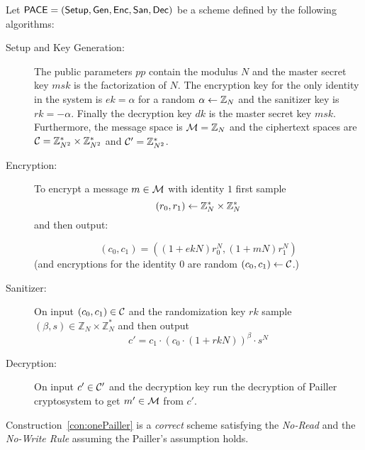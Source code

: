 \documentclass{llncs}
\begin{document}
\begin{construction} \label{con:onePailler} Let $\mathsf{PACE} = (\mathsf{Setup}, \mathsf{Gen}, \mathsf{Enc}, \mathsf{San}, \mathsf{Dec})$ be a \oACE scheme defined by the following algorithms:
\end{construction}
\begin{description}
\item[Setup and Key Generation:] The public parameters $pp$ contain the modulus $N$ and the master secret key $msk$ is the factorization of $N$. The encryption key for the only identity in the system is $ek=\alpha$ for a random $\alpha \leftarrow \mathbb{Z}_N$ and the sanitizer key is $rk=-\alpha$. Finally the decryption key $dk$ is the master secret key $msk$.
Furthermore, the message space is $\mathcal{M}=\mathbb{Z}_N$ and the ciphertext spaces are $\mathcal{C} = \mathbb{Z}^*_{N^2}\times\mathbb{Z}^*_{N^2}$ and $\mathcal{C}' = \mathbb{Z}^*_{N^2}$.

\item[Encryption:] To encrypt a message $m\in \mathcal{M}$ with identity $1$ first sample $$(r_0,r_1)\leftarrow\mathbb{Z}^*_N \times \mathbb{Z}^*_N$$ and then output:

$$
(c_0,c_1)=( (1+ekN) r_0^N, (1+mN) r_1^N)
$$
(and encryptions for the identity $0$ are random $(c_0,c_1)\leftarrow \mathcal{C}$.)

\item[Sanitizer:] On input $(c_0,c_1)\in \mathcal{C}$ and the randomization key $rk$ sample $(\beta,s) \in\mathbb{Z}_N \times  \mathbb{Z}^*_N $ and then output 
$$
c'= c_1\cdot (c_0 \cdot (1+rkN) )^\beta \cdot s^N
$$

\item[Decryption:] On input $c'\in \mathcal{C}'$ and the decryption key run the decryption of Pailler cryptosystem to get $m' \in \mathcal{M}$ from $c'$. 
\end{description}


\begin{lem} Construction~\ref{con:onePailler} is a \emph{correct} \oACE scheme satisfying the \emph{No-Read} and the \emph{No-Write Rule} assuming the Pailler's assumption holds.
\end{lem}
\end{document}
